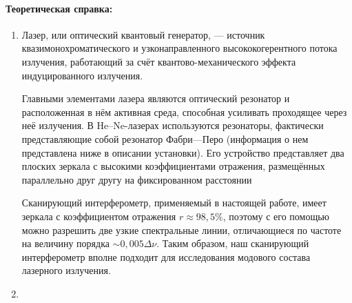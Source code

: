 \documentclass[a4paper,12pt]{article}
\begin{document}
\paragraph{Теоретическая справка:}
\begin{enumerate}
\itemsep0em
\item
Лазер, или оптический квантовый генератор, — источник квазимонохроматического и узконаправленного высококогерентного потока излучения, работающий за счёт квантово-механического эффекта индуцированного излучения.

Главными элементами лазера являются оптический резонатор и расположенная в нём активная среда, способная усиливать проходящее через неё излучения.
В He–Ne-лазерах используются резонаторы, фактически представляющие собой резонатор Фабри—Перо (информация о нем представлена ниже в описании установки). Его устройство представляет  два плоских зеркала с высокими коэффициентами отражения, размещённых параллельно друг другу на фиксированном расстоянии 

Сканирующий интерферометр, применяемый в настоящей работе, имеет зеркала с коэффициентом отражения $r\approx 98,5\%$, поэтому
с его помощью можно разрешить две узкие спектральные линии, отличающиеся по частоте на величину порядка $\sim 0,005\Delta \nu$. Таким образом, наш сканирующий интерферометр вполне подходит для исследования модового
состава лазерного излучения.
\item

\end{enumerate}
\end{document}
